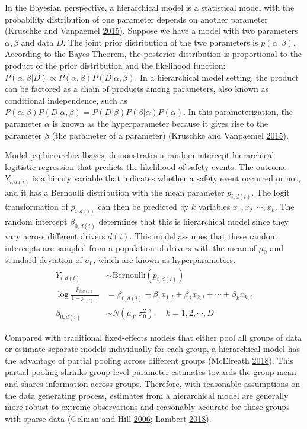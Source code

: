 \documentclass[12pt]{book}
\numberwithin{equation}{chapter}
\begin{document}
In the Bayesian perspective, a hierarchical model is a statistical model with the probability distribution of one parameter depends on another parameter (Kruschke and Vanpaemel \protect\hyperlink{ref-kruschke2015bayesian}{2015}). Suppose we have a model with two parameters \(\alpha, \beta\) and data \(D\). The joint prior distribution of the two parameters is \(p(\alpha, \beta)\). According to the Bayes Theorem, the posterior distribution is proportional to the product of the prior distribution and the likelihood function: \(P(\alpha, \beta|D) \propto P(\alpha, \beta)P(D|\alpha,\beta)\). In a hierarchical model setting, the product can be factored as a chain of products among parameters, also known as conditional independence, such as \(P(\alpha, \beta)P(D|\alpha,\beta) = P(D|\beta)P(\beta|\alpha)P(\alpha)\). In this parameterization, the parameter \(\alpha\) is known as the hyperparameter because it gives rise to the parameter \(\beta\) (the parameter of a parameter) (Kruschke and Vanpaemel \protect\hyperlink{ref-kruschke2015bayesian}{2015}).

Model \eqref{eq:hierarchicalbayes} demonstrates a random-intercept hierarchical logitistic regression that predicts the likelihood of safety events. The outcome \(Y_{i, d(i)}\) is a binary variable that indicates whether a safety event occurred or not, and it has a Bernoulli distribution with the mean parameter \(p_{i, d(i)}\). The logit transformation of \(p_{i, d(i)}\) can then be predicted by \(k\) variables \(x_1, x_2, \cdots, x_k\). The random intercept \(\beta_{0, d(i)}\) determines that this is hierarchical model since they vary across different drivers \(d(i)\). This model assumes that these random intercepts are sampled from a population of drivers with the mean of \(\mu_0\) and standard deviation of \(\sigma_0\), which are known as hyperparameters.
\begin{equation}
\begin{split}
Y_{i, d(i)} &\sim \text{Bernoulli}(p_{i, d(i)})\\
\log\frac{p_{i, d(i)}}{1-p_{i, d(i)}} &= \beta_{0, d(i)} + \beta_1x_{1,i} + \beta_2x_{2,i} + \cdots + \beta_kx_{k,i}\\
\beta_{0, d(i)} &\sim N(\mu_0, \sigma_0^2), \quad k = 1, 2, \cdots, D
\label{eq:hierarchicalbayes}
\end{split}
\end{equation}

Compared with traditional fixed-effects models that either pool all groups of data or estimate separate models individually for each group, a hierarchical model has the advantage of partial pooling across different groups (McElreath \protect\hyperlink{ref-mcelreath2018statistical}{2018}). This partial pooling shrinks group-level parameter estimates towards the group mean and shares information across groups. Therefore, with reasonable assumptions on the data generating process, estimates from a hierarchical model are generally more robust to extreme observations and reasonably accurate for those groups with sparse data (Gelman and Hill \protect\hyperlink{ref-gelman2006data}{2006}; Lambert \protect\hyperlink{ref-lambert2018student}{2018}).
\end{document}
